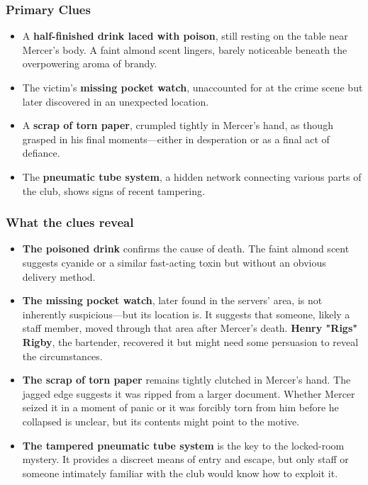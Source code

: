 \begin{Example}{}
	\subsubsection*{Primary Clues}
	\begin{itemize}
		\item A \textbf{half-finished drink laced with poison}, still resting on the table near Mercer’s body. A faint almond scent lingers, barely noticeable beneath the overpowering aroma of brandy.
		\item The victim’s \textbf{missing pocket watch}, unaccounted for at the crime scene but later discovered in an unexpected location.
		\item A \textbf{scrap of torn paper}, crumpled tightly in Mercer’s hand, as though grasped in his final moments—either in desperation or as a final act of defiance.
		\item The \textbf{pneumatic tube system}, a hidden network connecting various parts of the club, shows signs of recent tampering.
	\end{itemize}

	\subsubsection*{What the clues reveal}
	\begin{itemize}
		\item \textbf{The poisoned drink} confirms the cause of death. The faint almond scent suggests cyanide or a similar fast-acting toxin but without an obvious delivery method.
		\item \textbf{The missing pocket watch}, later found in the servers' area, is not inherently suspicious—but its location is. It suggests that someone, likely a staff member, moved through that area after Mercer’s death. \textbf{Henry "Rigs" Rigby}, the bartender, recovered it but might need some persuasion to reveal the circumstances.
		\item \textbf{The scrap of torn paper} remains tightly clutched in Mercer’s hand. The jagged edge suggests it was ripped from a larger document. Whether Mercer seized it in a moment of panic or it was forcibly torn from him before he collapsed is unclear, but its contents might point to the motive.
		\item \textbf{The tampered pneumatic tube system} is the key to the locked-room mystery. It provides a discreet means of entry and escape, but only staff or someone intimately familiar with the club would know how to exploit it.
	\end{itemize}
\end{Example}